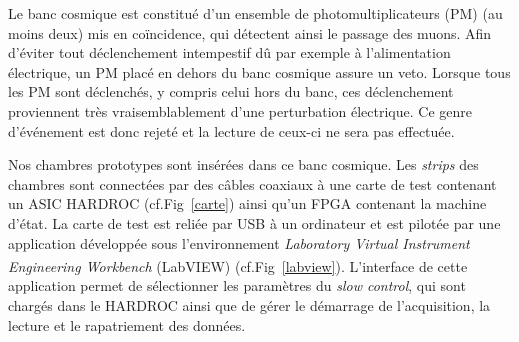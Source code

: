 Le banc cosmique est constitué d'un ensemble de photomultiplicateurs (PM) (au moins deux) mis en coïncidence, qui détectent ainsi le passage des muons. Afin d'éviter tout déclenchement intempestif dû par exemple à l'alimentation électrique, un PM placé en dehors du banc cosmique assure un veto. Lorsque tous les PM sont déclenchés, y compris celui hors du banc, ces déclenchement proviennent très vraisemblablement d'une perturbation électrique. Ce genre d'événement est donc rejeté et la lecture de ceux-ci ne sera pas effectuée.

Nos chambres prototypes sont insérées dans ce banc cosmique. Les \textit{strips} des chambres sont connectées par des câbles coaxiaux à une carte de test contenant un ASIC HARDROC (cf.Fig~\ref{carte}) ainsi qu'un FPGA contenant la machine d'état. La carte de test est reliée par USB à un ordinateur et est pilotée par une application développée sous l'environnement \textit{Laboratory Virtual Instrument Engineering Workbench} (LabVIEW\textsuperscript{\textregistered}) (cf.Fig~\ref{labview}). L'interface de cette application permet de sélectionner les paramètres du \textit{slow control}, qui sont chargés dans le HARDROC ainsi que de gérer le démarrage de l'acquisition, la lecture et le rapatriement des données. 

